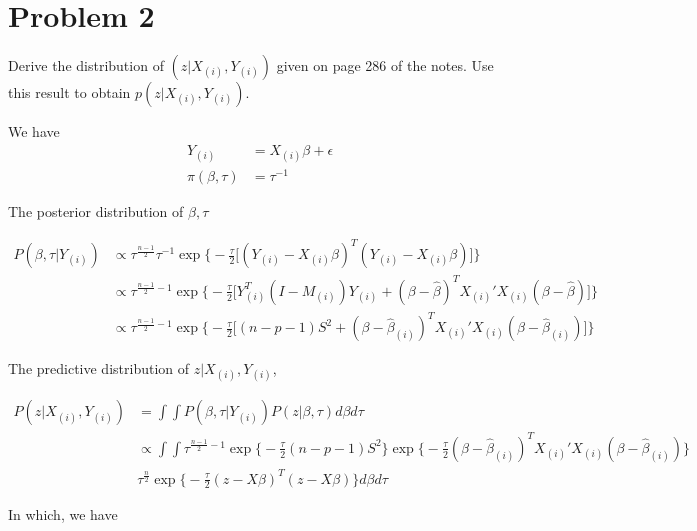 \section{Problem 2}
Derive the distribution of $(z| X_{(i)}, Y_{(i)})$ given on page 286 of the notes. Use this result to obtain $p(z| X_{(i)}, Y_{(i)})$.

We have 
  \begin{align*}
  Y_{(i)}& = X_{(i)} \beta + \epsilon \\
  \pi(\beta, \tau) &= \tau^{-1}
 \end{align*}

The posterior distribution of $\beta, \tau$

  \begin{align*}
  P(\beta, \tau | Y_{(i)}) &  \propto \tau^{\frac{n-1}{2}}  \tau^{-1} \exp \Big \{  -\frac{\tau}{2} \Big[ (Y_{(i)}- X_{(i)} \beta)^T (Y_{(i)}- X_{(i)} \beta)   \Big ] \Big  \} \\
  &  \propto \tau^{\frac{n-1}{2} -1} \exp \Big \{  -\frac{\tau}{2} \Big[ Y_{(i)}^T(I- M_{(i)}) Y_{(i)} + (\beta - \hat{\beta})^T X_{(i)}'  X_{(i)} (\beta - \hat{\beta}) \Big ] \Big \} \\
  & \propto \tau^{\frac{n-1}{2} -1} \exp \Big \{  -\frac{\tau}{2} \Big[ (n-p-1)S^2 + (\beta - \hat{\beta}_{(i)})^T X_{(i)}'  X_{(i)} (\beta - \hat{\beta}_{(i)}) \Big ] \Big \} 
 \end{align*}
 
 The predictive distribution of $z | X_{(i)}, Y_{(i)}$,
 
  \begin{align*}
  P(z | X_{(i)}, Y_{(i)}) &= \int \int  P(\beta, \tau | Y_{(i)}) P(z| \beta, \tau) d\beta d\tau \\
  & \propto \int \int \tau^{\frac{n-1}{2} -1} \exp \Big \{  -\frac{\tau}{2} (n-p-1)S^2 \Big \} \exp \Big \{  -\frac{\tau}{2} (\beta - \hat{\beta}_{(i)})^T X_{(i)}'  X_{(i)} (\beta - \hat{\beta}_{(i)}) \Big \} \\
  & \tau^{\frac{n}{2}} \exp \Big \{ -\frac{\tau}{2} (z - X \beta)^T(z - X \beta) \Big \} d\beta d\tau  
 \end{align*}
  
 In which, we have
 
